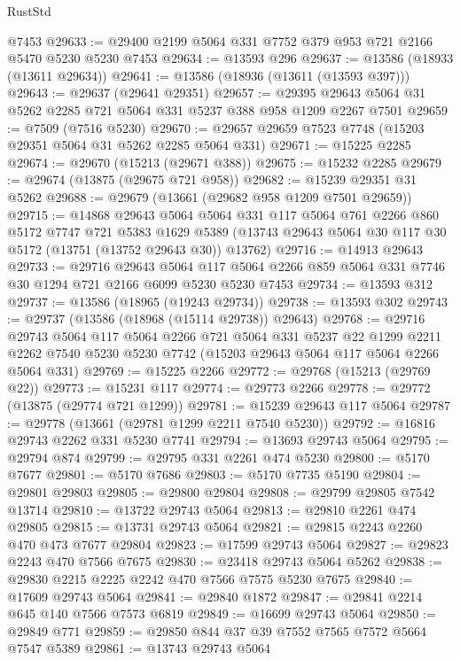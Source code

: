 \begin{lexlean}{RustStd}
\begin{coremodule}
    @7453
@29633 := @29400 @2199 @5064 @331 @7752 @379 @953 @721 @2166 @5470 @5230 @5230 @7453
@29634 := @13593 @296
@29637 := @13586 (@18933 (@13611 @29634))
@29641 := @13586 (@18936 (@13611 (@13593 @397)))
@29643 := @29637 (@29641 @29351)
@29657 := @29395 @29643 @5064 @31 @5262 @2285 @721 @5064 @331 @5237 @388 @958 @1209 @2267 @7501
@29659 := @7509 (@7516 @5230)
@29670 := @29657 @29659 @7523 @7748 (@15203 @29351 @5064 @31 @5262 @2285 @5064 @331)
@29671 := @15225 @2285
@29674 := @29670 (@15213 (@29671 @388))
@29675 := @15232 @2285
@29679 := @29674 (@13875 (@29675 @721 @958))
@29682 := @15239 @29351 @31 @5262
@29688 := @29679 (@13661 (@29682 @958 @1209 @7501 @29659))
@29715 := @14868
    @29643
    @5064
    @5064
    @331
    @117
    @5064
    @761
    @2266
    @860
    @5172
    @7747
    @721
    @5383
    @1629
    @5389
    (@13743 @29643 @5064 @30 @117 @30 @5172 (@13751 (@13752 @29643 @30)) @13762)
@29716 := @14913 @29643
@29733 := @29716
    @29643
    @5064
    @117
    @5064
    @2266
    @859
    @5064
    @331
    @7746
    @30
    @1294
    @721
    @2166
    @6099
    @5230
    @5230
    @7453
@29734 := @13593 @312
@29737 := @13586 (@18965 (@19243 @29734))
@29738 := @13593 @302
@29743 := @29737 (@13586 (@18968 (@15114 @29738)) @29643)
@29768 := @29716
    @29743
    @5064
    @117
    @5064
    @2266
    @721
    @5064
    @331
    @5237
    @22
    @1299
    @2211
    @2262
    @7540
    @5230
    @5230
    @7742
    (@15203 @29643 @5064 @117 @5064 @2266 @5064 @331)
@29769 := @15225 @2266
@29772 := @29768 (@15213 (@29769 @22))
@29773 := @15231 @117
@29774 := @29773 @2266
@29778 := @29772 (@13875 (@29774 @721 @1299))
@29781 := @15239 @29643 @117 @5064
@29787 := @29778 (@13661 (@29781 @1299 @2211 @7540 @5230))
@29792 := @16816 @29743 @2262 @331 @5230 @7741
@29794 := @13693 @29743 @5064
@29795 := @29794 @874
@29799 := @29795 @331 @2261 @474 @5230
@29800 := @5170 @7677
@29801 := @5170 @7686
@29803 := @5170 @7735 @5190
@29804 := @29801 @29803
@29805 := @29800 @29804
@29808 := @29799 @29805 @7542 @13714
@29810 := @13722 @29743 @5064
@29813 := @29810 @2261 @474 @29805
@29815 := @13731 @29743 @5064
@29821 := @29815 @2243 @2260 @470 @473 @7677 @29804
@29823 := @17599 @29743 @5064
@29827 := @29823 @2243 @470 @7566 @7675
@29830 := @23418 @29743 @5064 @5262
@29838 := @29830 @2215 @2225 @2242 @470 @7566 @7575 @5230 @7675
@29840 := @17609 @29743 @5064
@29841 := @29840 @1872
@29847 := @29841 @2214 @645 @140 @7566 @7573 @6819
@29849 := @16699 @29743 @5064
@29850 := @29849 @771
@29859 := @29850 @844 @37 @39 @7552 @7565 @7572 @5664 @7547 @5389
@29861 := @13743 @29743 @5064

\end{coremodule}
\end{lexlean}
